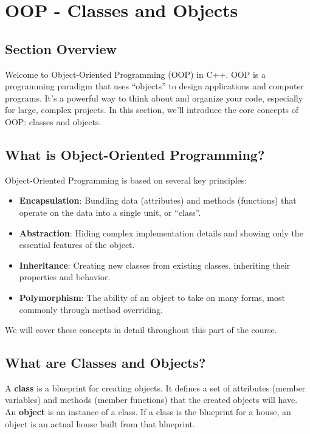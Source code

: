 \section{OOP - Classes and Objects}

\subsection{Section Overview}
Welcome to Object-Oriented Programming (OOP) in C++. OOP is a programming paradigm that uses ``objects'' to design applications and computer programs. It's a powerful way to think about and organize your code, especially for large, complex projects. In this section, we'll introduce the core concepts of OOP: classes and objects.

\subsection{What is Object-Oriented Programming?}
Object-Oriented Programming is based on several key principles:
\begin{itemize}
	\item \textbf{Encapsulation}: Bundling data (attributes) and methods (functions) that operate on the data into a single unit, or ``class''.
	\item \textbf{Abstraction}: Hiding complex implementation details and showing only the essential features of the object.
	\item \textbf{Inheritance}: Creating new classes from existing classes, inheriting their properties and behavior.
	\item \textbf{Polymorphism}: The ability of an object to take on many forms, most commonly through method overriding.
\end{itemize}
We will cover these concepts in detail throughout this part of the course.

\subsection{What are Classes and Objects?}
A \textbf{class} is a blueprint for creating objects. It defines a set of attributes (member variables) and methods (member functions) that the created objects will have. An \textbf{object} is an instance of a class. If a class is the blueprint for a house, an object is an actual house built from that blueprint.

